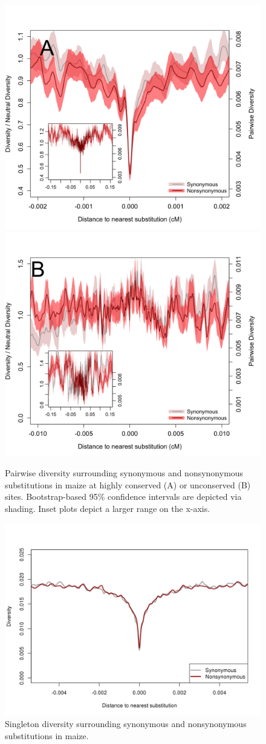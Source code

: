 \begin{figure}
  \includegraphics[width=.5\textwidth]{FigsAndFiles/plotDiversity_TvM_Conserved_Significance_June.png}
  \includegraphics[width=.5\textwidth]{FigsAndFiles/plotDiversity_TvM_Unconserved_Significance_June.png}
\caption{ Pairwise diversity surrounding synonymous and nonsynonymous
  substitutions in maize at highly conserved (A) or unconserved (B) sites.  Bootstrap-based 95\% confidence intervals are depicted via shading. Inset plots depict a larger range on the x-axis.}
\end{figure}
\clearpage

\begin{figure}
  \includegraphics[width=\textwidth]{FigsAndFiles/plotDiversity_TvM_Singletons.png}
\caption{ Singleton diversity surrounding synonymous and nonsynonymous
  substitutions in maize.}
\end{figure}
\clearpage

